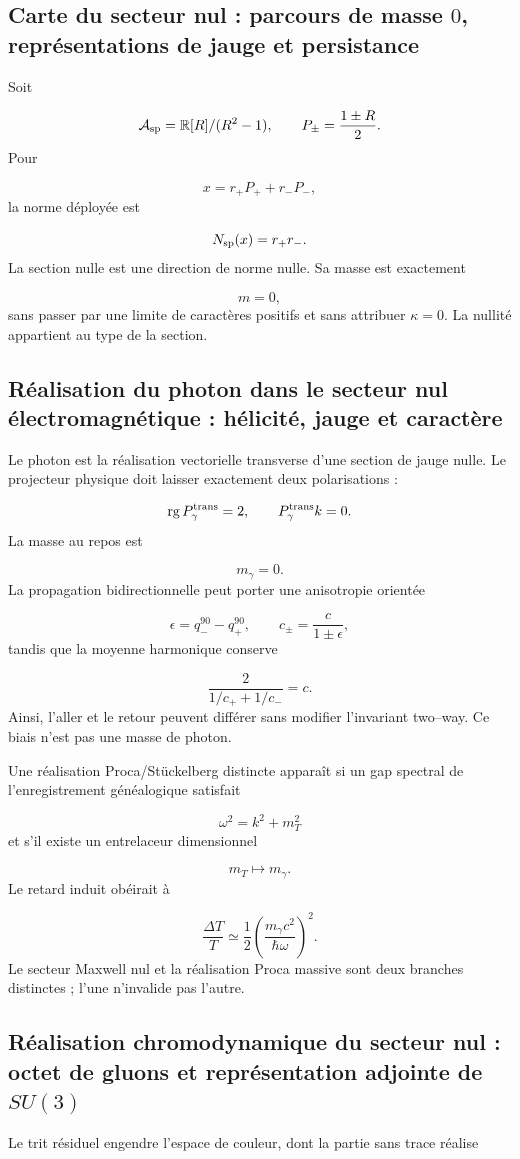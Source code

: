 \subsection{Carte du secteur nul : parcours de masse \(0\), représentations de jauge et persistance}
Soit

\[
 \mathcal A_{\rm sp}=\mathbb R[R]/(R^2-1),
 \qquad
 P_\pm=\frac{1\pm R}{2}.
\]
Pour

\[
 x=r_+P_++r_-P_-,
\]
la norme déployée est

\[
 N_{\rm sp}(x)=r_+r_-.
\]
La section nulle est une direction de norme nulle. Sa masse est exactement

\[
 m=0,
\]
sans passer par une limite de caractères positifs et sans attribuer \(\kappa=0\). La nullité appartient au type de la section.

\subsection{Réalisation du photon dans le secteur nul électromagnétique : hélicité, jauge et caractère}
Le photon est la réalisation vectorielle transverse d'une section de jauge nulle. Le projecteur physique doit laisser exactement deux polarisations :

\[
 \operatorname{rg}P_\gamma^{\rm trans}=2,
\qquad
 P_\gamma^{\rm trans}k=0.
\]
La masse au repos est

\[
 m_\gamma=0.
\]
La propagation bidirectionnelle peut porter une anisotropie orientée

\[
 \epsilon=q_-^{90}-q_+^{90},
\qquad
 c_\pm=\frac{c}{1\pm\epsilon},
\]
tandis que la moyenne harmonique conserve

\[
 \frac{2}{1/c_++1/c_-}=c.
\]
Ainsi, l'aller et le retour peuvent différer sans modifier l'invariant two--way. Ce biais n'est pas une masse de photon.

Une réalisation Proca/Stückelberg distincte apparaît si un gap spectral de l'enregistrement généalogique satisfait

\[
 \omega^2=k^2+m_T^2
\]
et s'il existe un entrelaceur dimensionnel

\[
 m_T\longmapsto m_\gamma.
\]
Le retard induit obéirait à

\[
 \frac{\Delta T}{T}
 \simeq\frac12
 \left(\frac{m_\gamma c^2}{\hbar\omega}\right)^2.
\]
Le secteur Maxwell nul et la réalisation Proca massive sont deux branches distinctes ; l'une n'invalide pas l'autre.

\subsection{Réalisation chromodynamique du secteur nul : octet de gluons et représentation adjointe de \(SU(3)\)}
Le trit résiduel engendre l'espace de couleur, dont la partie sans trace réalise

